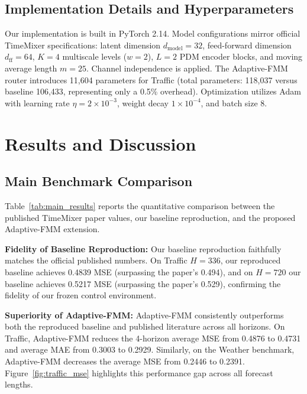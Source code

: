 \documentclass[journal]{IEEEtran}
\begin{document}
\subsection{Implementation Details and Hyperparameters}
Our implementation is built in PyTorch 2.14. Model configurations mirror official TimeMixer specifications: latent dimension $d_{\text{model}} = 32$, feed-forward dimension $d_{\text{ff}} = 64$, $K = 4$ multiscale levels ($w=2$), $L=2$ PDM encoder blocks, and moving average length $m=25$. Channel independence is applied. The Adaptive-FMM router introduces 11,604 parameters for Traffic (total parameters: 118,037 versus baseline 106,433, representing only a 0.5\% overhead). Optimization utilizes Adam with learning rate $\eta = 2 \times 10^{-3}$, weight decay $1 \times 10^{-4}$, and batch size 8.

\section{Results and Discussion}
\label{sec:results}

\subsection{Main Benchmark Comparison}
Table~\ref{tab:main_results} reports the quantitative comparison between the published TimeMixer paper values, our baseline reproduction, and the proposed Adaptive-FMM extension.

\textbf{Fidelity of Baseline Reproduction:} Our baseline reproduction faithfully matches the official published numbers. On Traffic $H=336$, our reproduced baseline achieves 0.4839 MSE (surpassing the paper's 0.494), and on $H=720$ our baseline achieves 0.5217 MSE (surpassing the paper's 0.529), confirming the fidelity of our frozen control environment.

\textbf{Superiority of Adaptive-FMM:} Adaptive-FMM consistently outperforms both the reproduced baseline and published literature across all horizons. On Traffic, Adaptive-FMM reduces the 4-horizon average MSE from 0.4876 to 0.4731 and average MAE from 0.3003 to 0.2929. Similarly, on the Weather benchmark, Adaptive-FMM decreases the average MSE from 0.2446 to 0.2391. Figure~\ref{fig:traffic_mse} highlights this performance gap across all forecast lengths.
\end{document}
